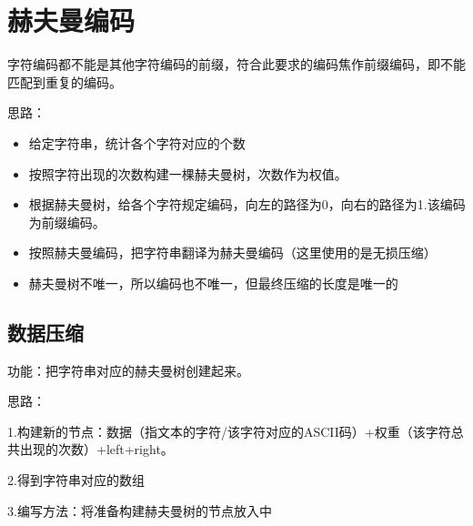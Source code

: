 \documentclass[a4paper]{report}
\begin{document}
\section{赫夫曼编码}
字符编码都不能是其他字符编码的前缀，符合此要求的编码焦作前缀编码，即不能匹配到重复的编码。

思路：
\begin{itemize}
  \item 给定字符串，统计各个字符对应的个数
  \item 按照字符出现的次数构建一棵赫夫曼树，次数作为权值。
  \item 根据赫夫曼树，给各个字符规定编码，向左的路径为0，向右的路径为1.该编码为前缀编码。
  \item 按照赫夫曼编码，把字符串翻译为赫夫曼编码（这里使用的是无损压缩）
  \item 赫夫曼树不唯一，所以编码也不唯一，但最终压缩的长度是唯一的
\end{itemize}
\subsection{数据压缩}
功能：把字符串对应的赫夫曼树创建起来。

思路：

1.构建新的节点：数据（指文本的字符/该字符对应的ASCII码）+权重（该字符总共出现的次数）+left+right。

2.得到字符串对应的数组

3.编写方法：将准备构建赫夫曼树的节点放入中
\end{document}
